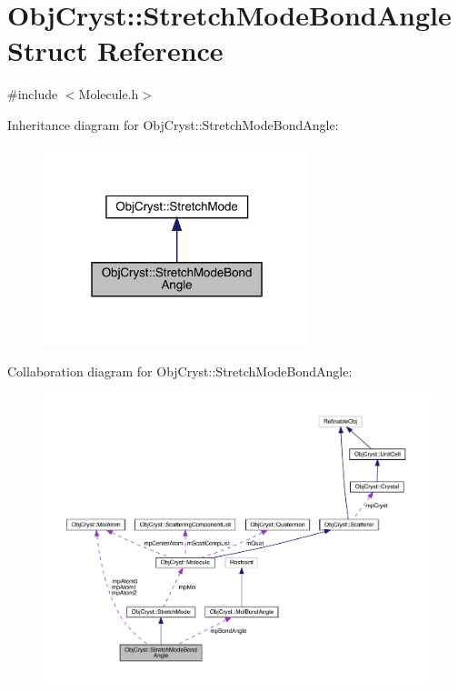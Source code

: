\hypertarget{struct_obj_cryst_1_1_stretch_mode_bond_angle}{}\section{Obj\+Cryst\+::Stretch\+Mode\+Bond\+Angle Struct Reference}
\label{struct_obj_cryst_1_1_stretch_mode_bond_angle}


{\ttfamily \#include $<$Molecule.\+h$>$}



Inheritance diagram for Obj\+Cryst\+::Stretch\+Mode\+Bond\+Angle\+:
\nopagebreak
\begin{figure}[H]
\begin{center}
\leavevmode
\includegraphics[width=220pt]{struct_obj_cryst_1_1_stretch_mode_bond_angle__inherit__graph}
\end{center}
\end{figure}


Collaboration diagram for Obj\+Cryst\+::Stretch\+Mode\+Bond\+Angle\+:
\nopagebreak
\begin{figure}[H]
\begin{center}
\leavevmode
\includegraphics[width=350pt]{struct_obj_cryst_1_1_stretch_mode_bond_angle__coll__graph}
\end{center}
\end{figure}
